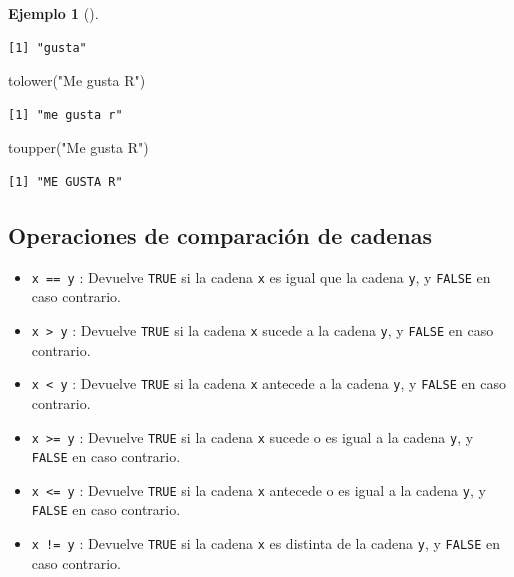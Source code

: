 \documentclass[
  a4paper,
]{scrreport}
\newenvironment{Shaded}{\begin{snugshade}}{\end{snugshade}}
\newcommand{\FunctionTok}[1]{\textcolor[rgb]{0.28,0.35,0.67}{#1}}
\newcommand{\NormalTok}[1]{\textcolor[rgb]{0.00,0.23,0.31}{#1}}
\newcommand{\StringTok}[1]{\textcolor[rgb]{0.13,0.47,0.30}{#1}}
\providecommand{\tightlist}{%
  \setlength{\itemsep}{0pt}\setlength{\parskip}{0pt}}\usepackage{longtable,booktabs,array}
\theoremstyle{definition}
\theoremstyle{definition}
\newtheorem{example}{Ejemplo}[chapter]
\theoremstyle{remark}
\begin{document}
\begin{example}[]
\begin{verbatim}
[1] "gusta"
\end{verbatim}

\begin{Shaded}
\begin{Highlighting}[]
\FunctionTok{tolower}\NormalTok{(}\StringTok{"Me gusta R"}\NormalTok{)}
\end{Highlighting}
\end{Shaded}

\begin{verbatim}
[1] "me gusta r"
\end{verbatim}

\begin{Shaded}
\begin{Highlighting}[]
\FunctionTok{toupper}\NormalTok{(}\StringTok{"Me gusta R"}\NormalTok{)}
\end{Highlighting}
\end{Shaded}

\begin{verbatim}
[1] "ME GUSTA R"
\end{verbatim}

\end{example}

\subsection{Operaciones de comparación de
cadenas}\label{operaciones-de-comparaciuxf3n-de-cadenas}

\begin{itemize}
\tightlist
\item
  \texttt{x\ ==\ y} : Devuelve \texttt{TRUE} si la cadena \texttt{x} es
  igual que la cadena \texttt{y}, y \texttt{FALSE} en caso contrario.
\item
  \texttt{x\ \textgreater{}\ y} : Devuelve \texttt{TRUE} si la cadena
  \texttt{x} sucede a la cadena \texttt{y}, y \texttt{FALSE} en caso
  contrario.
\item
  \texttt{x\ \textless{}\ y} : Devuelve \texttt{TRUE} si la cadena
  \texttt{x} antecede a la cadena \texttt{y}, y \texttt{FALSE} en caso
  contrario.
\item
  \texttt{x\ \textgreater{}=\ y} : Devuelve \texttt{TRUE} si la cadena
  \texttt{x} sucede o es igual a la cadena \texttt{y}, y \texttt{FALSE}
  en caso contrario.
\item
  \texttt{x\ \textless{}=\ y} : Devuelve \texttt{TRUE} si la cadena
  \texttt{x} antecede o es igual a la cadena \texttt{y}, y
  \texttt{FALSE} en caso contrario.
\item
  \texttt{x\ !=\ y} : Devuelve \texttt{TRUE} si la cadena \texttt{x} es
  distinta de la cadena \texttt{y}, y \texttt{FALSE} en caso contrario.
\end{itemize}
\end{document}
